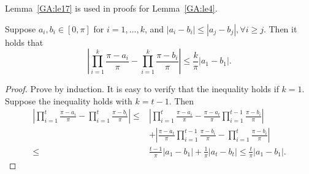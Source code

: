 Lemma~\ref{GA:le17} is used in proofs for Lemma~\ref{GA:le4}.
\begin{lemma} \label{GA:le17}
Suppose $a_i, b_i \in [0, \pi]$ for $i = 1, \ldots, k$, and $|a_i - b_i| \leq |a_j - b_j|, \forall i \geq j$. Then it holds that
\begin{equation*}
\left|\prod_{i = 1}^k \frac{\pi - a_i}{\pi} - \prod_{i = 1}^k \frac{\pi - b_i}{\pi}\right| \leq \frac{k}{\pi} |a_1 - b_1|.
\end{equation*}
\end{lemma}
\begin{proof}
Prove by induction. It is easy to verify that the inequality holds if $k = 1$.
Suppose the inequality holds with $k = t - 1$. Then
\begin{align*}
\left|\prod_{i = 1}^{t} \frac{\pi - a_i}{\pi} - \prod_{i = 1}^t \frac{\pi - b_i}{\pi}\right| \leq& \left|\prod_{i = 1}^{t} \frac{\pi - a_i}{\pi} - \frac{\pi - a_t}{\pi} \prod_{i = 1}^{t-1} \frac{\pi - b_i}{\pi}\right| \\
&+ \left|\frac{\pi - a_t}{\pi} \prod_{i = 1}^{t-1} \frac{\pi - b_i}{\pi} - \prod_{i = 1}^t \frac{\pi - b_i}{\pi}\right| \\
\leq& \frac{t-1}{\pi} |a_1 - b_1| + \frac{1}{\pi} |a_t - b_t| \leq \frac{t}{\pi} |a_1 - b_1|.
\end{align*}
\end{proof}


